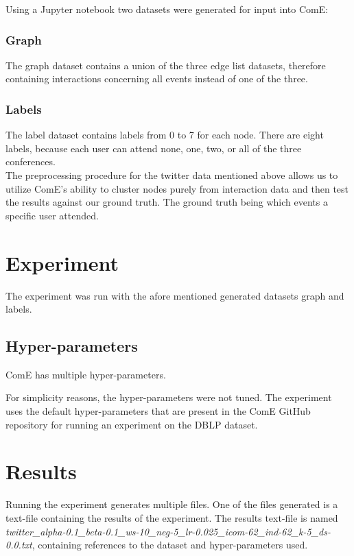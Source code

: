 \documentclass[sigconf, anonymous]{acmart}
\begin{document}
Using a Jupyter notebook two datasets were generated for input into ComE:

\subsubsection{Graph} The graph dataset contains a union of the three edge list datasets, therefore containing interactions concerning all events instead of one of the three.

\subsubsection{Labels} The label dataset contains labels from 0 to 7 for each node. There are eight labels, because each user can attend none, one, two, or all of the three conferences.
\\

The preprocessing procedure for the twitter data mentioned above allows us to utilize ComE's ability to cluster nodes purely from interaction data and then test the results against our ground truth. The ground truth being which events a specific user attended.

\section{Experiment}

The experiment was run with the afore mentioned generated datasets graph and labels.

\subsection{Hyper-parameters}

ComE has multiple hyper-parameters.

For simplicity reasons, the hyper-parameters were not tuned. The experiment uses the default hyper-parameters that are present in the ComE GitHub repository for running an experiment on the DBLP dataset\cite{ComE}.

\section{Results}

Running the experiment generates multiple files. One of the files generated is a text-file containing the results of the experiment. The results text-file is named \textit{twitter\_alpha-0.1\_beta-0.1\_ws-10\_neg-5\_lr-0.025\_icom-62\_ind-62\_k-5\_ds-0.0.txt}, containing references to the dataset and hyper-parameters used.
\end{document}
